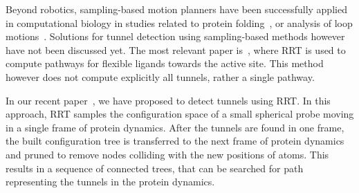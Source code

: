 \documentclass{svmult}
\begin{document}
Beyond robotics, sampling-based motion planners have been successfully applied in computational biology in studies
related to 
protein folding~\cite{al2012motion,gipson2012computational,cortes2010simulating,amato2002using,raveh2009rapid,novinskaya2015improving,songPFintro}, or analysis of loop motions~\cite{cortes2004geometric}.
Solutions for tunnel detection using sampling-based methods however have not been discussed yet.
The most relevant paper is~\cite{guieysse2008structure}, where RRT is used to compute pathways for flexible ligands towards 
the active site.
This method however does not compute explicitly all tunnels, rather a single pathway.

In our recent paper~\cite{vonasek2016application}, we have proposed to detect tunnels using RRT.
In this approach, RRT samples the configuration space of a small spherical probe moving in a single frame of protein dynamics.
After the tunnels are found in one frame, the built  configuration tree is transferred to the next frame of protein dynamics and pruned to remove
nodes colliding with the new positions of atoms.
This results in a sequence of connected trees, that can be searched for path representing the tunnels in the protein dynamics.

\end{document}

